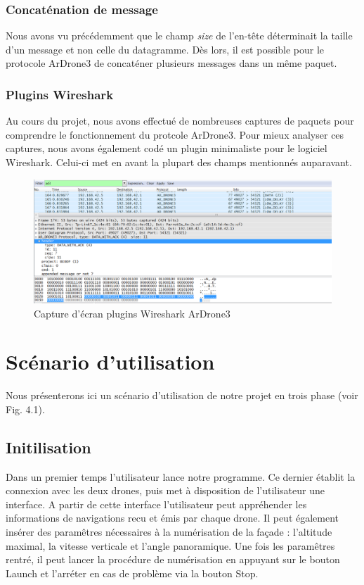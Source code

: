 \documentclass[12pt, openany]{report}
\begin{document}
\subsection{Concaténation de message}
Nous avons vu précédemment que le champ \textit{size} de l'en-tête déterminait la taille d'un message et non celle du datagramme. Dès lors, il est possible pour le protocole ArDrone3 de concaténer plusieurs messages dans un même paquet.

\subsection{Plugins Wireshark}

Au cours du projet, nous avons effectué de nombreuses captures de paquets pour comprendre le fonctionnement du protcole ArDrone3. Pour mieux analyser ces captures, nous avons également codé un plugin minimaliste pour le logiciel Wireshark. Celui-ci met en avant la plupart des champs mentionnés auparavant.


\begin{figure}[!h]
  \centering
  \includegraphics[width=\textwidth]{figures/dis.png}
  \caption{Capture d'écran plugins Wireshark ArDrone3}
  \label{fig:schema}
\end{figure}

\chapter{Scénario d'utilisation}

Nous présenterons ici un scénario d'utilisation de notre projet en trois phase (voir Fig. 4.1).

\section{Initilisation}

Dans un premier temps l'utilisateur lance notre programme. Ce dernier établit la connexion avec les deux drones, puis met à disposition de l'utilisateur une interface. A partir de cette interface l'utilisateur peut appréhender les informations de navigations recu et émis par chaque drone. Il peut également insérer des paramêtres nécessaires à la numérisation de la façade : l'altitude maximal, la vitesse verticale et l'angle panoramique. Une fois les paramêtres rentré, il peut lancer la procédure de numérisation en appuyant sur le bouton Launch et l'arréter en cas de problème via la bouton Stop.
\end{document}
